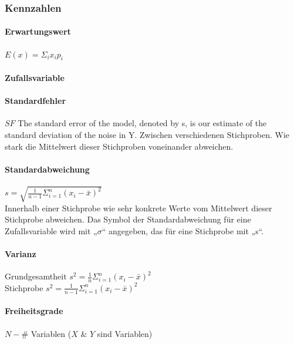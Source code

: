 \documentclass[a3paper, 8pt]{extarticle}
\begin{document}
\setlength{\abovedisplayskip}{6pt}
\setlength{\belowdisplayskip}{6pt}
\setlength{\abovedisplayshortskip}{5pt}
\setlength{\belowdisplayshortskip}{5pt}


\RaggedRight


\begin{multicols*}{5}

\subsubsection{Kennzahlen}
\paragraph{Erwartungswert}
    $E(x)=\Sigma_i x_i p_i$

\paragraph{Zufallsvariable}
 
\paragraph{Standardfehler} $SF$ The standard error of the model, denoted by s, is our estimate of the standard deviation of the noise in Y. Zwischen verschiedenen Stichproben. Wie stark die Mittelwert dieser Stichproben voneinander abweichen.

    
\paragraph{Standardabweichung} $s= \sqrt{\frac{1}{n-1}\Sigma_{i=1}^n (x_i - \bar{x})^2}$\\ Innerhalb einer Stichprobe wie sehr konkrete Werte vom Mittelwert dieser Stichprobe abweichen.
Das Symbol der Standardabweichung für eine Zufallsvariable wird mit „$\sigma$“ angegeben, das für eine Stichprobe mit „s“.
 

\paragraph{Varianz}
Grundgesamtheit $s^2 = \frac{1}{n}\Sigma_{i=1}^n (x_i - \bar{x})^2$\\
Stichprobe $s^2 = \frac{1}{n-1}\Sigma_{i=1}^n (x_i - \bar{x})^2$

\paragraph{Freiheitsgrade} $N-\#$ Variablen ($X$ \& $Y$ sind Variablen)


\end{multicols*}
\end{document}
